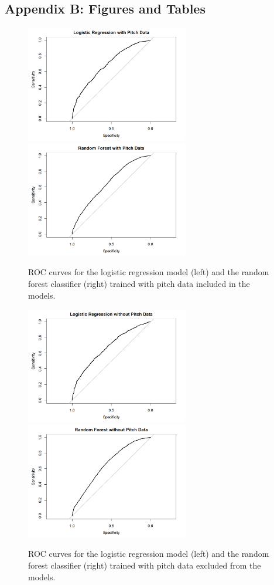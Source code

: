 \documentclass{article}
\begin{document}
\subsection*{Appendix B: Figures and Tables}
\begin{figure}[h]
    \centering
    \includegraphics[height=2in]{images/reduced_glm_roc.png}
    \includegraphics[height=2in]{images/full_rf_roc.png}
    \caption{ROC curves for the logistic regression model (left) and the random forest classifier (right) trained with pitch data included in the models.}
    \label{fig1_roc}
\end{figure}

\begin{figure}[h]
    \centering
    \includegraphics[height=2in]{images/reduced_pitchless_glm_roc.png}
    \includegraphics[height=2in]{images/pitchless_rf_roc.png}
    \caption{ROC curves for the logistic regression model (left) and the random forest classifier (right) trained with pitch data excluded from the models.}
    \label{fig2_roc}
\end{figure}
\end{document}

